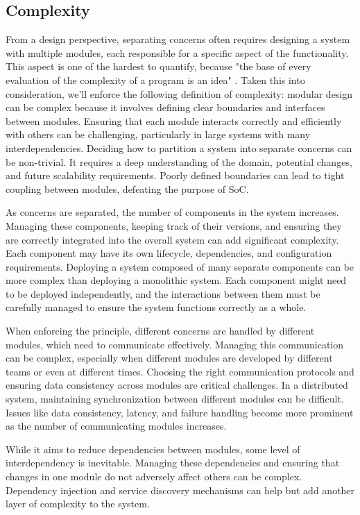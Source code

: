\subsection{Complexity}
From a design perspective, separating concerns often requires designing a system with multiple modules, each responsible for a specific aspect of the functionality.
This aspect is one of the hardest to quantify, because "the base of every evaluation of the complexity of a program is an idea" \cite{complexity}.
Taken this into consideration, we'll enforce the following definition of complexity:
modular design can be complex because it involves defining clear boundaries and interfaces between modules.
Ensuring that each module interacts correctly and efficiently with others can be challenging, particularly in large systems with many interdependencies.
Deciding how to partition a system into separate concerns can be non-trivial. It requires a deep understanding of the domain, potential changes, and future scalability requirements. Poorly defined boundaries can lead to tight coupling between modules, defeating the purpose of SoC.
\par
As concerns are separated, the number of components in the system increases. Managing these components, keeping track of their versions, and ensuring they are correctly integrated into the overall system can add significant complexity. Each component may have its own lifecycle, dependencies, and configuration requirements.
Deploying a system composed of many separate components can be more complex than deploying a monolithic system. Each component might need to be deployed independently, and the interactions between them must be carefully managed to ensure the system functions correctly as a whole.
\par
When enforcing the principle, different concerns are handled by different modules, which need to communicate effectively. Managing this communication can be complex, especially when different modules are developed by different teams or even at different times. Choosing the right communication protocols and ensuring data consistency across modules are critical challenges.
In a distributed system, maintaining synchronization between different modules can be difficult. Issues like data consistency, latency, and failure handling become more prominent as the number of communicating modules increases.
\par
While it aims to reduce dependencies between modules, some level of interdependency is inevitable. Managing these dependencies and ensuring that changes in one module do not adversely affect others can be complex. Dependency injection and service discovery mechanisms can help but add another layer of complexity to the system.
